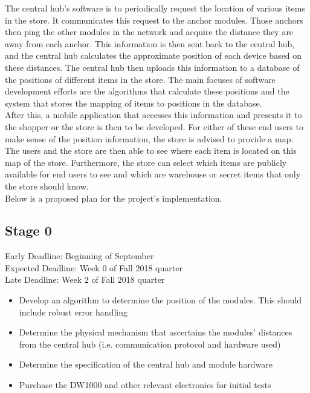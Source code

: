 \documentclass{article}
\begin{document}
The central hub's software is to periodically request the location of various items in the store.
It communicates this request to the anchor modules.
Those anchors then ping the other modules in the network and acquire the distance they are away from each anchor.
This information is then sent back to the central hub, and the central hub calculates the approximate position of each device based on these distances.
The central hub then uploads this information to a database of the positions of different items in the store.
The main focuses of software development efforts are the algorithms that calculate these positions and the system that stores the mapping of items to positions in the database. \\

After this, a mobile application that accesses this information and presents it to the shopper or the store is then to be developed.
For either of these end users to make sense of the position information, the store is advised to provide a map.
The users and the store are then able to see where each item is located on this map of the store.
Furthermore, the store can select which items are publicly available for end users to see and which are warehouse or secret items that only the store should know. \\

Below is a proposed plan for the project's implementation.
\subsection{Stage 0}
Early Deadline: Beginning of September \\
Expected Deadline: Week 0 of Fall 2018 quarter \\
Late Deadline: Week 2 of Fall 2018 quarter \\
\begin{itemize}
\item Develop an algorithm to determine the position of the modules. This should include robust error handling
\item Determine the physical mechanism that ascertains the modules' distances from the central hub (i.e. communication protocol and hardware used)
\item Determine the specification of the central hub and module hardware
\item Purchase the DW1000 and other relevant electronics for initial tests
\end{itemize}
\end{document}
